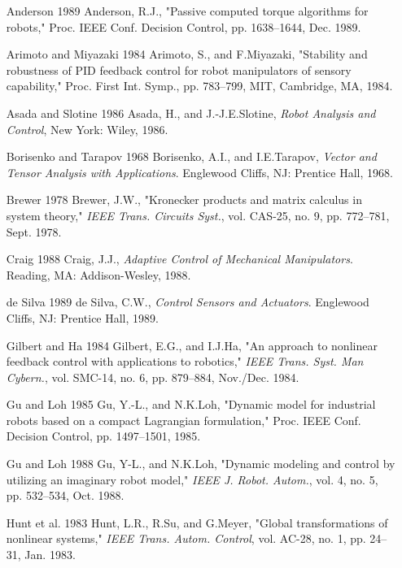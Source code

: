 \documentclass[12pt,a4paper]{ctexart}
\begin{document}
\begin{enumerate}
\item [Anderson 1989] Anderson, R.J., "Passive computed torque algorithms for robots," Proc. IEEE Conf. Decision Control, pp. 1638--1644, Dec. 1989.

\item [Arimoto and Miyazaki 1984] Arimoto, S., and F.Miyazaki, "Stability and robustness of PID feedback control for robot manipulators of sensory capability," Proc. First Int. Symp., pp. 783--799, MIT, Cambridge, MA, 1984.

\item [Asada and Slotine 1986] Asada, H., and J.-J.E.Slotine, \textit{Robot Analysis and Control}, New York: Wiley, 1986.

\item [Borisenko and Tarapov 1968] Borisenko, A.I., and I.E.Tarapov, \textit{Vector and Tensor Analysis with Applications}. Englewood Cliffs, NJ: Prentice Hall, 1968.

\item [Brewer 1978] Brewer, J.W., "Kronecker products and matrix calculus in system theory," \textit{IEEE Trans. Circuits Syst.}, vol. CAS-25, no. 9, pp. 772--781, Sept. 1978.

\item [Craig 1988] Craig, J.J., \textit{Adaptive Control of Mechanical Manipulators}. Reading, MA: Addison-Wesley, 1988.

\item [de Silva 1989] de Silva, C.W., \textit{Control Sensors and Actuators}. Englewood Cliffs, NJ: Prentice Hall, 1989.

\item [Gilbert and Ha 1984] Gilbert, E.G., and I.J.Ha, "An approach to nonlinear feedback control with applications to robotics," \textit{IEEE Trans. Syst. Man Cybern.}, vol. SMC-14, no. 6, pp. 879--884, Nov./Dec. 1984.

\item [Gu and Loh 1985] Gu, Y.-L., and N.K.Loh, "Dynamic model for industrial robots based on a compact Lagrangian formulation," Proc. IEEE Conf. Decision Control, pp. 1497--1501, 1985.

\item [Gu and Loh 1988] Gu, Y-L., and N.K.Loh, "Dynamic modeling and control by utilizing an imaginary robot model," \textit{IEEE J. Robot. Autom.}, vol. 4, no. 5, pp. 532--534, Oct. 1988.

\item [Hunt et al. 1983] Hunt, L.R., R.Su, and G.Meyer, "Global transformations of nonlinear systems," \textit{IEEE Trans. Autom. Control}, vol. AC-28, no. 1, pp. 24--31, Jan. 1983.


\end{enumerate}
\end{document}
